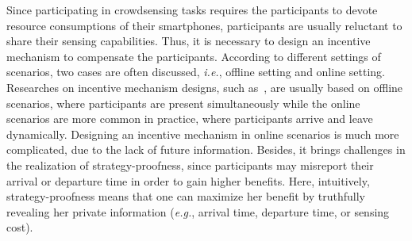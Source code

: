 \documentclass[conference,compsocconf,letterpaper,10pt]{IEEEtran}
\newcommand{\ie}{{\em i.e.}}
\newcommand{\eg}{{\em e.g.}}
\begin{document}
Since participating in crowdsensing tasks requires the participants to devote resource consumptions of their smartphones, participants are usually reluctant to share their sensing capabilities. Thus, it is necessary to design an incentive mechanism to compensate the participants. According to different settings of scenarios, two cases are often discussed, \ie, offline setting and online setting. Researches on incentive mechanism designs, such as~\cite{yang2012crowdsourcing,koutsopoulos2013optimal}, are usually based on offline scenarios, where participants are present simultaneously while the online scenarios are more common in practice, where participants arrive and leave dynamically. Designing an incentive mechanism in online scenarios is much more complicated, due to the lack of future information. Besides, it brings challenges in the realization of strategy-proofness, since participants may misreport their arrival or departure time in order to gain higher benefits. Here, intuitively, strategy-proofness means that one can maximize her benefit by truthfully revealing her private information (\eg, arrival time, departure time, or sensing cost).

\end{document}
